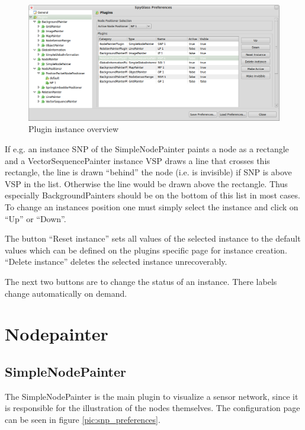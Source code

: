 \begin{figure}[htb]
  \begin{center}
    \includegraphics[width=13.2cm]{./pics/plugin_instances_overview}
    \caption{Plugin instance overview}
    \label{pic:plugin_instances_overview}
  \end{center}
\end{figure}

If e.g. an instance SNP of the SimpleNodePainter paints a node as a rectangle and a VectorSequencePainter instance VSP 
draws a line that crosses this rectangle, the line is drawn ``behind'' the node (i.e. is invisible) if SNP
is above VSP in the list. Otherwise the line would be drawn above the rectangle. Thus especially BackgroundPainters
should be on the bottom of this list in most cases. To change an
instances position one must simply select the instance and click on ``Up'' or ``Down''.

The button ``Reset instance'' sets all values of the selected instance to the default values which can be defined on the
plugins specific page for instance creation. ``Delete instance'' deletes the selected instance unrecoverably.

The next two buttons are to change the status of an instance. There labels change automatically on demand.

\newpage
\section{Nodepainter}

\subsection{SimpleNodePainter}

The SimpleNodePainter is the main plugin to visualize a sensor network, since it is responsible for the illustration
of the nodes themselves. The configuration page can be seen in figure \ref{pic:snp_preferences}.

